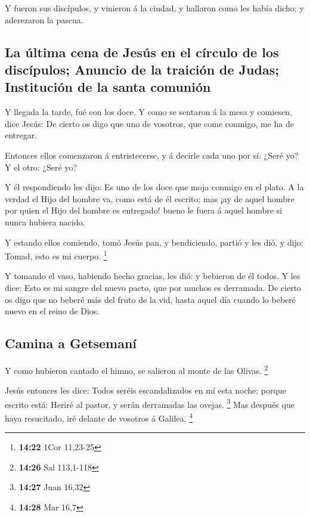  Y fueron sus discípulos, y vinieron á la ciudad, y
hallaron como les había dicho; y aderezaron la pascua.

\hypertarget{la-uxfaltima-cena-de-jesuxfas-en-el-cuxedrculo-de-los-discuxedpulos-anuncio-de-la-traiciuxf3n-de-judas-instituciuxf3n-de-la-santa-comuniuxf3n}{%
\subsection{La última cena de Jesús en el círculo de los discípulos;
Anuncio de la traición de Judas; Institución de la santa
comunión}\label{la-uxfaltima-cena-de-jesuxfas-en-el-cuxedrculo-de-los-discuxedpulos-anuncio-de-la-traiciuxf3n-de-judas-instituciuxf3n-de-la-santa-comuniuxf3n}}

 Y llegada la tarde, fué con los doce.  Y como
se sentaron á la mesa y comiesen, dice Jesús: De cierto os digo que uno
de vosotros, que come conmigo, me ha de entregar.

 Entonces ellos comenzaron á entristecerse, y á decirle
cada uno por sí: ¿Seré yo? Y el otro: ¿Seré yo?

 Y él respondiendo les dijo: Es uno de los doce que moja
conmigo en el plato.  A la verdad el Hijo del hombre va,
como está de él escrito; mas ¡ay de aquel hombre por quien el Hijo del
hombre es entregado! bueno le fuera á aquel hombre si nunca hubiera
nacido.

 Y estando ellos comiendo, tomó Jesús pan, y bendiciendo,
partió y les dió, y dijo: Tomad, esto es mi cuerpo. \footnote{\textbf{14:22}
  1Cor 11,23-25}

 Y tomando el vaso, habiendo hecho gracias, les dió: y
bebieron de él todos.  Y les dice: Esto es mi sangre del
nuevo pacto, que por muchos es derramada.  De cierto os
digo que no beberé más del fruto de la vid, hasta aquel día cuando lo
beberé nuevo en el reino de Dios.

\hypertarget{camina-a-getsemanuxed}{%
\subsection{Camina a Getsemaní}\label{camina-a-getsemanuxed}}

 Y como hubieron cantado el himno, se salieron al monte de
las Olivas. \footnote{\textbf{14:26} Sal 113,1-118}

 Jesús entonces les dice: Todos seréis escandalizados en mí
esta noche; porque escrito está: Heriré al pastor, y serán derramadas
las ovejas. \footnote{\textbf{14:27} Juan 16,32}  Mas
después que haya resucitado, iré delante de vosotros á Galilea.
\footnote{\textbf{14:28} Mar 16,7}

